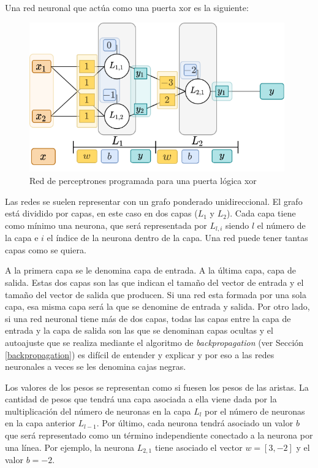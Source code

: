 Una red neuronal que actúa como una puerta \acrshort{xor} es la siguiente:
\begin{figure}[H]
    \centering
    \includegraphics[width=11cm]{images/state-of-art/perceptron/xor.png}
    \caption{Red de perceptrones programada para una puerta lógica \acrshort{xor}}
    \label{fig:xorgatenetwork}
\end{figure}

Las redes se suelen representar con un grafo ponderado unidireccional. El grafo está dividido por capas, en este caso en dos capas ($L_1$ y $L_2$). Cada capa tiene como mínimo una neurona, que será representada por $L_{l,i}$ siendo $l$ el número de la capa e $i$ el índice de la neurona dentro de la capa. Una red puede tener tantas capas como se quiera.
\newline

A la primera capa se le denomina capa de entrada. A la última capa, capa de salida. Estas dos capas son las que indican el tamaño del vector de entrada y el tamaño del vector de salida que producen. Si una red esta formada por una sola capa, esa misma capa será la que se denomine de entrada y salida. Por otro lado, si una red neuronal tiene más de dos capas, todas las capas entre la capa de entrada y la capa de salida son las que se denominan capas ocultas y el autoajuste que se realiza mediante el algoritmo de \textit{backpropagation} (ver Sección \ref{backpropagation}) es difícil de entender y explicar y por eso a las redes neuronales a veces se les denomina cajas negras. 
\newline

Los valores de los pesos se representan como si fuesen los pesos de las aristas. La cantidad de pesos que tendrá una capa asociada a ella viene dada por la multiplicación del número de neuronas en la capa $L_{l}$ por el número de neuronas en la capa anterior $L_{l-1}$. Por último, cada neurona tendrá asociado un valor $b$ que será representado como un término independiente conectado a la neurona por una línea. Por ejemplo, la neurona $L_{2,1}$ tiene asociado el vector $w = [3, -2]$ y el valor $b = -2$.
\newline

